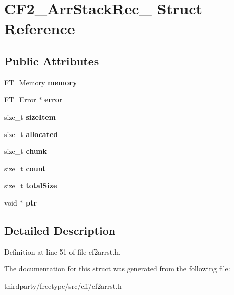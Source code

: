 \hypertarget{struct_c_f2___arr_stack_rec__}{}\section{C\+F2\+\_\+\+Arr\+Stack\+Rec\+\_\+ Struct Reference}
\label{struct_c_f2___arr_stack_rec__}
\subsection*{Public Attributes}
\begin{DoxyCompactItemize}
\item 
\mbox{\label{struct_c_f2___arr_stack_rec___a8ec28de11a8a30bc59b914fa10cca17c}} 
F\+T\+\_\+\+Memory {\bfseries memory}
\item 
\mbox{\label{struct_c_f2___arr_stack_rec___abd5d7e6217d9d7dabadbcc86b0257b25}} 
F\+T\+\_\+\+Error $\ast$ {\bfseries error}
\item 
\mbox{\label{struct_c_f2___arr_stack_rec___a40f0768fa64c43497e974cf983139bf1}} 
size\+\_\+t {\bfseries size\+Item}
\item 
\mbox{\label{struct_c_f2___arr_stack_rec___a84bdd99ace4f6b07a1f552e822eb17f9}} 
size\+\_\+t {\bfseries allocated}
\item 
\mbox{\label{struct_c_f2___arr_stack_rec___a52fc3a68b5ad19b7fbfd628354b4e27d}} 
size\+\_\+t {\bfseries chunk}
\item 
\mbox{\label{struct_c_f2___arr_stack_rec___a7d11e24def70eb62913ec44e86fd2666}} 
size\+\_\+t {\bfseries count}
\item 
\mbox{\label{struct_c_f2___arr_stack_rec___a6b81219eb40d7890a29b922b3055d05d}} 
size\+\_\+t {\bfseries total\+Size}
\item 
\mbox{\label{struct_c_f2___arr_stack_rec___a5929bad275226a6247bb79a166fe1b7c}} 
void $\ast$ {\bfseries ptr}
\end{DoxyCompactItemize}


\subsection{Detailed Description}


Definition at line 51 of file cf2arrst.\+h.



The documentation for this struct was generated from the following file\+:\begin{DoxyCompactItemize}
\item 
thirdparty/freetype/src/cff/cf2arrst.\+h\end{DoxyCompactItemize}
